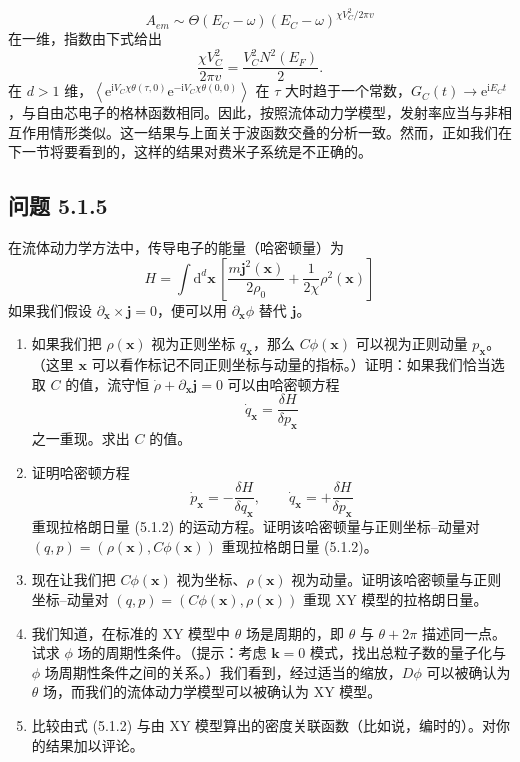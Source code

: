 \begin{equation*}
A_{em}\sim\Theta(E_C-\omega)(E_C-\omega)^{\chi V_C^2/2\pi v}
\end{equation*}
在一维，指数由下式给出
\begin{equation*}
\frac{\chi V_C^2}{2\pi v}=\frac{V_C^2N^2(E_F)}{2}.\tag{5.1.7}
\end{equation*}
在 $d>1$ 维，$\left\langle\mathrm{e}^{\mathrm{i}V_C\chi\theta(\tau,0)}\mathrm{e}^{-\mathrm{i}V_C\chi\theta(0,0)}\right\rangle$ 在 $\tau$ 大时趋于一个常数，$G_C(t)\to\mathrm{e}^{\mathrm{i}E_Ct}$，与自由芯电子的格林函数相同。因此，按照流体动力学模型，发射率应当与非相互作用情形类似。这一结果与上面关于波函数交叠的分析一致。然而，正如我们在下一节将要看到的，这样的结果对费米子系统是不正确的。

\subsection*{问题 5.1.5}

在流体动力学方法中，传导电子的能量（哈密顿量）为
\begin{equation*}
H=\int\mathrm{d}^d\pmb{x}\,\left[\frac{m\pmb{j}^2(\pmb{x})}{2\rho_0}+\frac{1}{2\chi}\rho^2(\pmb{x})\right]
\end{equation*}
如果我们假设 $\partial_{\pmb{x}}\times\pmb{j}=0$，便可以用 $\partial_{\pmb{x}}\phi$ 替代 $\pmb{j}$。
\begin{enumerate}
\item 如果我们把 $\rho(\pmb{x})$ 视为正则坐标 $q_{\pmb{x}}$，那么 $C\phi(\pmb{x})$ 可以视为正则动量 $p_{\pmb{x}}$。（这里 $\pmb{x}$ 可以看作标记不同正则坐标与动量的指标。）证明：如果我们恰当选取 $C$ 的值，流守恒 $\dot{\rho}+\partial_{\pmb{x}}\pmb{j}=0$ 可以由哈密顿方程
\begin{equation*}
\dot{q}_{\pmb{x}}=\frac{\delta H}{\delta p_{\pmb{x}}}
\end{equation*}
之一重现。求出 $C$ 的值。
\item 证明哈密顿方程
\begin{equation*}
\dot{p}_{\pmb{x}}=-\frac{\delta H}{\delta q_{\pmb{x}}},\qquad \dot{q}_{\pmb{x}}=+\frac{\delta H}{\delta p_{\pmb{x}}}
\end{equation*}
重现拉格朗日量 (5.1.2) 的运动方程。证明该哈密顿量与正则坐标--动量对 $(q,p)\allowbreak=(\rho(\pmb{x}),C\phi(\pmb{x}))$ 重现拉格朗日量 (5.1.2)。
\item 现在让我们把 $C\phi(\pmb{x})$ 视为坐标、$\rho(\pmb{x})$ 视为动量。证明该哈密顿量与正则坐标--动量对 $(q,p)=(C\phi(\pmb{x}),\rho(\pmb{x}))$ 重现 XY 模型的拉格朗日量。
\item 我们知道，在标准的 XY 模型中 $\theta$ 场是周期的，即 $\theta$ 与 $\theta+2\pi$ 描述同一点。试求 $\phi$ 场的周期性条件。（提示：考虑 $\pmb{k}=0$ 模式，找出总粒子数的量子化与 $\phi$ 场周期性条件之间的关系。）我们看到，经过适当的缩放，$D\phi$ 可以被确认为 $\theta$ 场，而我们的流体动力学模型可以被确认为 XY 模型。
\item 比较由式 (5.1.2) 与由 XY 模型算出的密度关联函数（比如说，编时的）。对你的结果加以评论。
\end{enumerate}

